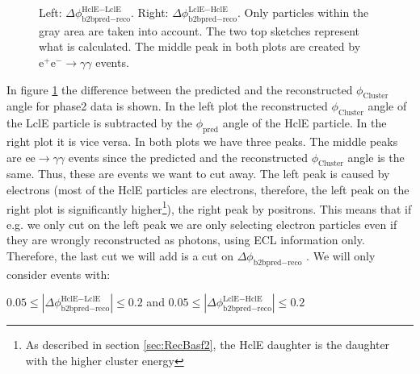\documentclass[a4paper,11pt,twosided,final,german,openbib,pdftex,listof=totoc,bibliography=totoc]{scrbook}
\begin{document}
\begin{figure}[h!]
\begin{minipage}[b]{\textwidth}
	\caption[b2bClusterPhi - clusterPhi For Beamtime-Data]{Left: $\Delta \phi _{\textrm{b2bpred} - \textrm{reco}}^{\textrm{HclE}-\textrm{LclE}}$. Right:  $\Delta \phi _{\textrm{b2bpred} - \textrm{reco}}^{\textrm{LclE}-\textrm{HclE}}$. Only particles within the gray area are taken into account. The two top sketches represent what is calculated. The middle peak in both plots are created by $\textrm{e}^+\textrm{e}^- \rightarrow \gamma \gamma$ events.}
	\label{fig:b2bData}

\end{minipage}
\end{figure}


In figure \ref{fig:b2bData} the difference between the predicted and the reconstructed $\phi_{\textrm{Cluster}}$ angle for phase2 data is shown. In the left plot the reconstructed $\phi_{\textrm{Cluster}}$ angle of the LclE particle is subtracted by the  $\phi_{\textrm{pred}}$  angle of the HclE particle. In the right plot it is vice versa. In both plots we have three peaks. The middle peaks are $\textrm{ee} \rightarrow \gamma \gamma$ events since the predicted and the reconstructed $\phi_{\textrm{Cluster}}$ angle is the same. Thus, these are events we want to cut away. The left peak is caused by electrons (most of the HclE particles are electrons, therefore, the left peak on the right plot is significantly higher\footnote{As described in section \ref{sec:RecBasf2}, the HclE daughter is the daughter with the higher cluster energy}), the right peak by positrons. This means that if e.g. we only cut on the left peak we are only selecting electron particles even if they are wrongly reconstructed as photons, using ECL information only. 
Therefore, the last cut we will add is a cut on $\Delta \phi _{\textrm{b2bpred} - \textrm{reco}}$ . We will only consider events with:
\newline













 $0.05 \leq |\Delta \phi _{\textrm{b2bpred} - \textrm{reco}}^{\textrm{HclE}-\textrm{LclE}}| \leq 0.2 $ and  $0.05 \leq |\Delta \phi _{\textrm{b2bpred} - \textrm{reco}}^{\textrm{LclE}-\textrm{HclE}}| \leq 0.2$
\newline
\end{document}
